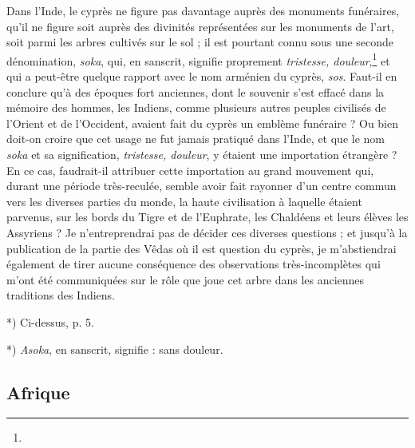 \documentclass[a4paper, 11pt, oneside, polutonikogreek, french]{article}
\begin{document}
Dans l'Inde, le cyprès ne figure pas davantage auprès des monuments funéraires, qu'il ne figure soit auprès des divinités représentées sur les monuments de l'art, soit parmi les arbres cultivés sur le sol ; il est pourtant connu sous une seconde dénomination, \emph{soka}, qui, en sanscrit, signifie proprement \emph{tristesse, douleur},\footnote{} et qui a peut-être quelque rapport avec le nom arménien du cyprès, \emph{sos}. Faut-il en conclure qu'à des époques fort anciennes, dont le souvenir s'est effacé dans la mémoire des hommes, les Indiens, comme plusieurs autres peuples civilisés de l'Orient et de l'Occident, avaient fait du cyprès un emblème funéraire ? Ou bien doit-on croire que cet usage ne fut jamais pratiqué dans l'Inde, et que le nom \emph{soka} et sa signification, \emph{tristesse, douleur}, y étaient une importation étrangère ? En ce cas, faudrait-il attribuer cette importation au grand mouvement qui, durant une période très-reculée, semble avoir fait rayonner d'un centre commun vers les diverses parties du monde, la haute civilisation à laquelle étaient parvenus, sur les bords du Tigre et de l'Euphrate, les Chaldéens et leurs élèves les Assyriens ? Je n'entreprendrai pas de décider ces diverses questions ; et jusqu'à la publication de la partie des Vêdas où il est question du cyprès, je m'abstiendrai également de tirer aucune conséquence des observations très-incomplètes qui m'ont été communiquées sur le rôle que joue cet arbre dans les anciennes traditions des Indiens.

*) Ci-dessus, p. 5.

*) \emph{Asoka}, en sanscrit, signifie : sans douleur.
\clearpage
\subsection{Afrique}
\end{document}
